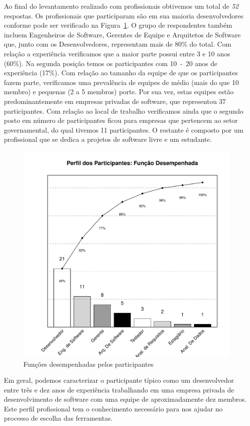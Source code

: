 Ao final do levantamento realizado com profissionais obtivemos um total de
\textit{52} respostas. Os profissionais que participaram são em sua maioria
desenvolvedores conforme pode ser verificado na
Figura~\ref{fig:grafico_escolha_ferramentas_funcao_participantes}. O grupo de
respondentes também incluem Engenheiros de Software, Gerentes de Equipe e
Arquitetos de Software que, junto com os Desenvolvedores, representam mais de
80\% do total. Com relação a experiência verificamos que a maior parte possui
entre 3 e 10 anos (60\%). Na segunda posição temos os participantes com 10~-~20
anos de experiência (17\%). Com relação ao tamanho da equipe de que os
participantes fazem parte, verificamos uma prevalência de equipes de médio (mais
do que 10 membro) e pequenas (2 a 5 membros) porte. Por sua vez, estas equipes
estão predominantemente em empresas privadas de software, que representou 37
participantes. Com relação ao local de trabalho verificamos ainda que o segundo
posto em número de par\-ti\-ci\-pan\-tes ficou para empresas que pertencem ao
setor governamental, do qual tivemos 11 participantes. O restante é composto por
um profissional que se dedica a projetos de software livre e um estudante.

\begin{figure}[htpb]
	\centering
	\includegraphics[width=0.5\linewidth]{./chapter-estudo-funcionalidades-fgrm/img/grafico_escolha_ferramentas_funcao_participantes.pdf}
	\caption{Funções desempenhadas pelos participantes}
\label{fig:grafico_escolha_ferramentas_funcao_participantes}
\end{figure}

Em geral, podemos caracterizar o participante típico como um desenvolvedor entre
três e dez anos de experiência trabalhando em uma empresa privada de
desenvolvimento de software com uma equipe de aproximadamente dez membros. Este
perfil profissional tem o conhecimento necessário para nos ajudar no processo de
escolha das ferramentas.

